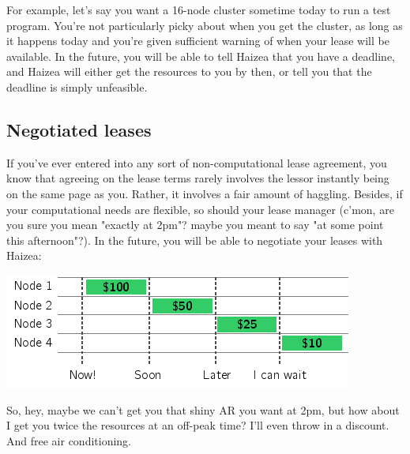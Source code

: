 For example, let's say you want a 16-node cluster sometime today to run a test program. You're not particularly picky about when you get the cluster, as long as it happens today and you're given sufficient warning of when your lease will be available. In the future, you will be able to tell Haizea that you have a deadline, and Haizea will either get the resources to you by then, or tell you that the deadline is simply unfeasible.

\subsection{Negotiated leases}

If you've ever entered into any sort of non-computational lease agreement, you know that agreeing on the lease terms rarely involves the lessor instantly being on the same page as you. Rather, it involves a fair amount of haggling. Besides, if your computational needs are flexible, so should your lease manager (c'mon, are you sure you mean "exactly at 2pm"? maybe you meant to say "at some point this afternoon"?). In the future, you will be able to negotiate your leases with Haizea:

\begin{center}
\includegraphics{images/lease_negotiate.png}
\end{center}


So, hey, maybe we can't get you that shiny AR you want at 2pm, but how about I get you twice the resources at an off-peak time? I'll even throw in a discount. And free air conditioning.